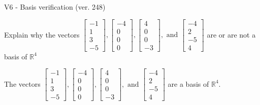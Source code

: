\begin{exercise}
  \begin{exerciseTitle}V6 - Basis verification (ver. 248)\end{exerciseTitle}
  \begin{exerciseStatement}
    Explain why the vectors \(\left[\begin{array}{r}
-1 \\
1 \\
3 \\
-5
\end{array}\right] , \left[\begin{array}{r}
-4 \\
0 \\
0 \\
0
\end{array}\right] , \left[\begin{array}{r}
4 \\
0 \\
0 \\
-3
\end{array}\right] , \text{ and } \left[\begin{array}{r}
-4 \\
2 \\
-5 \\
4
\end{array}\right]\) are or are not a basis of \(\mathbb{R}^4\)	


  \end{exerciseStatement}
  \begin{exerciseAnswer}
   The vectors \(\left[\begin{array}{r}
-1 \\
1 \\
3 \\
-5
\end{array}\right] , \left[\begin{array}{r}
-4 \\
0 \\
0 \\
0
\end{array}\right] , \left[\begin{array}{r}
4 \\
0 \\
0 \\
-3
\end{array}\right] , \text{ and } \left[\begin{array}{r}
-4 \\
2 \\
-5 \\
4
\end{array}\right]\) 
  	 are  a basis of \(\mathbb{R}^4\).
  


  \end{exerciseAnswer}
\end{exercise}